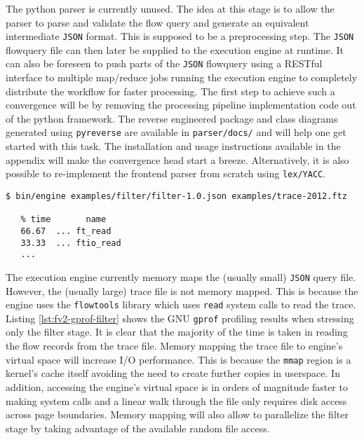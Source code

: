 The python parser is currently unused. The idea at this stage is to allow the
parser to parse and validate the flow query and generate an equivalent
intermediate \texttt{JSON} format. This is supposed to be a preprocessing
step. The \texttt{JSON} flowquery file can then later be supplied to the
execution engine at runtime.  It can also be foreseen to push parts of the
\texttt{JSON} flowquery using a RESTful interface to  multiple map/reduce jobs running the execution engine to completely
distribute the workflow for faster processing. The first step to achieve such
a convergence will be by removing the processing pipeline implementation code
out of the python framework. The reverse engineered package and class diagrams
generated using \texttt{pyreverse} are available in \texttt{parser/docs/} and
will help one get started with this task. The installation and usage
instructions available in the appendix will make the convergence head start a
breeze. Alternatively, it is also possible to re-implement the frontend parser
from scratch using \texttt{lex/YACC}.




\begin{lstlisting}
$ bin/engine examples/filter/filter-1.0.json examples/trace-2012.ftz

   % time   	name
   66.67  ... ft_read
   33.33  ... ftio_read
   ...
\end{lstlisting}

The execution engine currently memory maps the (usually small) \texttt{JSON}
query file. However, the (usually large) trace file is not memory mapped. This
is because the engine uses the \texttt{flowtools} library which uses
\texttt{read} system calls to read the trace. Listing
\ref{lst:fv2-gprof-filter} shows the GNU \texttt{gprof} \cite{graham:1982}
profiling results when  stressing only the filter stage.  It is clear that the majority of
the time is taken in reading the flow records from the trace file.  Memory
mapping the trace file to engine's virtual space will increase I/O
performance. This is because the \texttt{mmap} region is a kernel's cache
itself avoiding the need to create further copies in userspace.  In addition,
accessing the engine's virtual space is in orders of magnitude faster to
making system calls and a linear walk through the file only requires disk
access across page boundaries. Memory mapping will also allow to parallelize
the filter stage by taking advantage of the available random file access.





